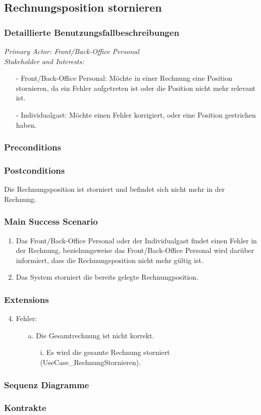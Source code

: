 \documentclass[./detailed_overview_usecases.tex]{subfiles}
\begin{document}
    \subsection{Rechnungsposition stornieren}
    \subsubsection{Detaillierte Benutzungsfallbeschreibungen}
    \textit{Primary Actor: Front/Back-Office Personal}
    \\
    \textit{Stakeholder and Interests:}
    \begin{itemize}
        \item[-] Front/Back-Office Personal: Möchte in einer Rechnung eine Position stornieren, da ein Fehler aufgetreten ist oder die Position nicht mehr relevant ist.
        \item[-] Individualgast: Möchte einen Fehler korrigiert, oder eine Position gestrichen haben.
    \end{itemize}

    \subsubsection*{Preconditions}

    \subsubsection*{Postconditions}
    Die Rechnungsposition ist storniert und befindet sich nicht mehr in der Rechnung.

    \subsubsection*{Main Success Scenario}
    \begin{enumerate}
        \item Das Front/Back-Office Personal oder der Individualgast findet einen Fehler in der Rechnung, beziehungsweise das Front/Back-Office Personal wird darüber informiert, dass die Rechnungsposition nicht mehr gültig ist.
        \item Das System storniert die bereits gelegte Rechnungposition.
    \end{enumerate}

    \subsubsection*{Extensions}
    \begin{enumerate}
        \setcounter{enumi}{3}
        \item Fehler:
        \begin{itemize}
            \item[a.] Die Gesamtrechnung ist nicht korrekt.
            \begin{itemize}
                \item[i.] Es wird die gesamte Rechnung storniert (UseCase_RechnungStornieren).
            \end{itemize}
        \end{itemize}
    \end{enumerate}
    \subsubsection{Sequenz Diagramme}
    \subsubsection{Kontrakte}
\end{document}
